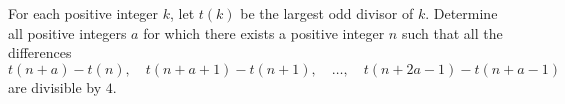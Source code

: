 For each positive integer $k$, let $t(k)$ be the largest odd divisor of $k$. Determine all positive integers $a$ for which there exists a positive integer $n$ such that all the differences
\[
t(n + a) - t(n), \quad t(n + a + 1) - t(n + 1), \quad \ldots, \quad t(n + 2a - 1) - t(n + a - 1)
\]
are divisible by $4$.
